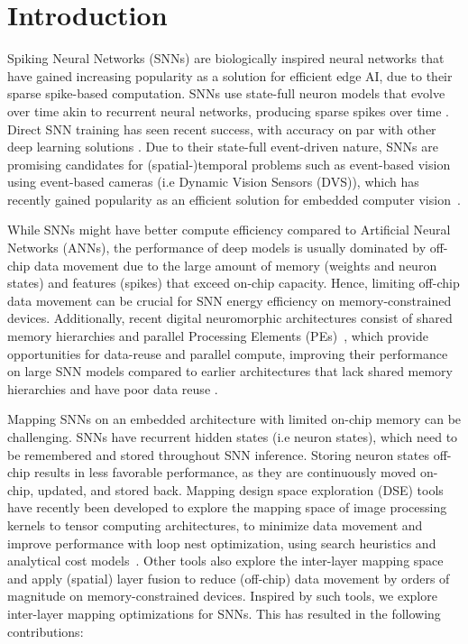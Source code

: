 \section{Introduction}

Spiking Neural Networks (SNNs) are biologically inspired neural networks that have gained increasing popularity as a solution for efficient edge AI, due to their sparse spike-based computation. SNNs use state-full neuron models that evolve over time akin to recurrent neural networks, producing sparse spikes over time \cite{8891809}. Direct SNN training has seen recent success, with accuracy on par with other deep learning solutions \cite{sewresnet, 10376840}. Due to their state-full event-driven nature, SNNs are promising candidates for (spatial-)temporal problems such as event-based vision using event-based cameras (i.e Dynamic Vision Sensors (DVS)), which has recently gained popularity as an efficient solution for embedded computer vision~\cite{gallego2020event}.


While SNNs might have better compute efficiency compared to Artificial Neural Networks (ANNs), the performance of deep models is usually dominated by off-chip data movement due to the large amount of memory (weights and neuron states) and features (spikes) that exceed on-chip capacity. Hence, limiting off-chip data movement can be crucial for SNN energy efficiency on memory-constrained devices. Additionally, recent digital neuromorphic architectures consist of shared memory hierarchies and parallel Processing Elements (PEs)~\cite{10132492, 9855834}, which provide opportunities for data-reuse and parallel compute, improving their performance on large SNN models compared to earlier architectures that lack shared memory hierarchies and have poor data reuse \cite{senapati2022thorneuromorphicprocessor}. 


Mapping SNNs on an embedded architecture with limited on-chip memory can be challenging. SNNs have recurrent hidden states (i.e neuron states), which need to be remembered and stored throughout SNN inference. Storing neuron states off-chip results in less favorable performance, as they are continuously moved on-chip, updated, and stored back. Mapping design space exploration (DSE) tools have recently been developed to explore the mapping space of image processing kernels to tensor computing architectures, to minimize data movement and improve performance with loop nest optimization, using search heuristics and analytical cost models~\cite{zigzag,9923807}. Other tools also explore the inter-layer mapping space and apply (spatial) layer fusion to reduce (off-chip) data movement by orders of magnitude on memory-constrained devices\cite{stream, Sioutas2020ScheduleSF, 9646923, 8667835}. Inspired by such tools\cite{zigzag, stream}, 
we explore inter-layer mapping optimizations
for SNNs. This has resulted in the following contributions:

